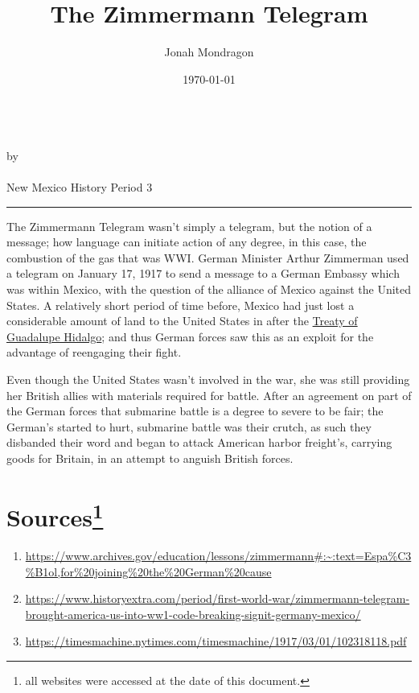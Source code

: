 \documentclass[12pt]{article}
\newcommand{\PutTitle}[1]
{
    \begin{center}
        {\huge\bfseries\thetitle}\\
        by \theauthor\\
        \thedate\\
        #1
    \end{center}
    \hrule
    \vspace{2ex}
}
\begin{document}
\title{The Zimmermann Telegram}
\author{Jonah Mondragon}
\date{\today}
\PutTitle{New Mexico History Period 3}
\pagestyle{headings}
\doublespacing

The Zimmermann Telegram wasn't simply a telegram, but the notion of a message; how language can initiate action of any degree, in this case, the combustion of the gas that was WWI.
German Minister Arthur Zimmerman used a telegram on January 17, 1917 to send a message to a German Embassy which was within Mexico, with the question of the alliance of Mexico against the United States.
A relatively short period of time before, Mexico had just lost a considerable amount of land to the United States in after the
\href{https://www.ourdocuments.gov/doc.php?flash=false&doc=26}{Treaty of Guadalupe Hidalgo}; and thus German forces saw this as an exploit for the advantage of reengaging their fight.

Even though the United States wasn't involved in the war, she was still providing her British allies with materials required for battle.
After an agreement on part of the German forces that submarine battle is a degree to severe to be fair; the German's started to hurt, submarine battle was their crutch, as such they disbanded their word and began to attack American harbor freight's, carrying goods for Britain, in an attempt to anguish British forces.


\newpage
\sloppy

\section*{Sources\footnote{all websites were accessed at the date of this document.}}
\begin{enumerate}
    \item{\url{https://www.archives.gov/education/lessons/zimmermann#:~:text=Espa%C3%B1ol,for%20joining%20the%20German%20cause}}
    \item{\url{https://www.historyextra.com/period/first-world-war/zimmermann-telegram-brought-america-us-into-ww1-code-breaking-signit-germany-mexico/}}
    \item{\url{https://timesmachine.nytimes.com/timesmachine/1917/03/01/102318118.pdf}}
    
\end{enumerate}
\end{document}
